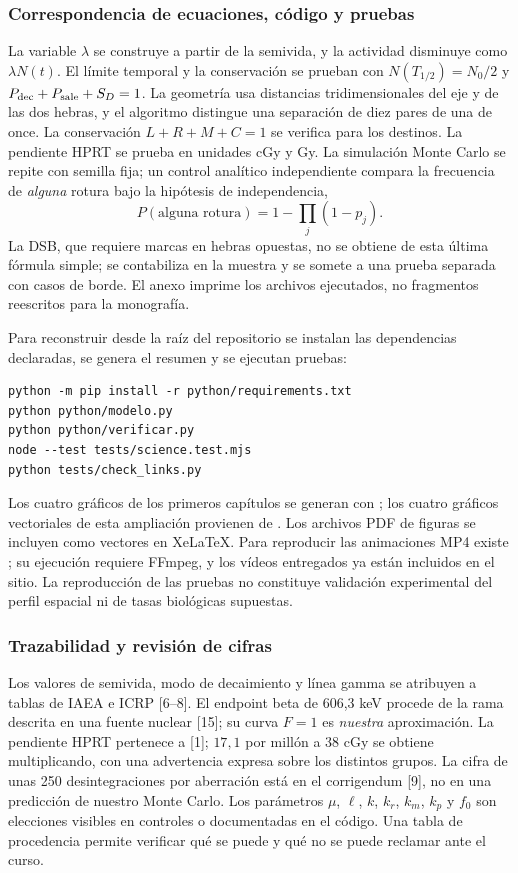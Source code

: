 \documentclass[11pt,a4paper,oneside]{article}
\begin{document}
\subsubsection{Correspondencia de ecuaciones, código y pruebas}
La variable $\lambda$ se construye a partir de la semivida, y la actividad
disminuye como $\lambda N(t)$. El límite temporal y la conservación se
prueban con $N(T_{1/2})=N_0/2$ y
$P_{\rm dec}+P_{\rm sale}+S_D=1$. La geometría usa distancias
tridimensionales del eje y de las dos hebras, y el algoritmo distingue
una separación de diez pares de una de once. La conservación
$L+R+M+C=1$ se verifica para los destinos. La pendiente HPRT se prueba
en unidades cGy y Gy. La simulación Monte Carlo se repite con semilla
fija; un control analítico independiente compara la frecuencia de
\emph{alguna} rotura bajo la hipótesis de independencia,
\[
P(\text{alguna rotura})=1-\prod_{j}(1-p_j).
\]
La DSB, que requiere marcas en hebras opuestas, no se obtiene de esta
última fórmula simple; se contabiliza en la muestra y se somete a una
prueba separada con casos de borde. El anexo imprime los archivos
ejecutados, no fragmentos reescritos para la monografía.

Para reconstruir desde la raíz del repositorio se instalan las
dependencias declaradas, se genera el resumen y se ejecutan pruebas:
\begin{verbatim}
python -m pip install -r python/requirements.txt
python python/modelo.py
python python/verificar.py
node --test tests/science.test.mjs
python tests/check_links.py
\end{verbatim}
Los cuatro gráficos de los primeros capítulos se generan con
; los cuatro gráficos vectoriales
de esta ampliación provienen de .
Los archivos PDF de figuras se incluyen como vectores en XeLaTeX.
Para reproducir las animaciones MP4 existe ; su
ejecución requiere FFmpeg, y los vídeos entregados ya están incluidos
en el sitio. La reproducción de las pruebas no constituye validación
experimental del perfil espacial ni de tasas biológicas supuestas.

\subsubsection{Trazabilidad y revisión de cifras}
Los valores de semivida, modo de decaimiento y línea gamma se atribuyen
a tablas de IAEA e ICRP [6--8]. El endpoint beta de 606,3 keV procede
de la rama descrita en una fuente nuclear [15]; su curva $F=1$ es
\emph{nuestra} aproximación. La pendiente HPRT pertenece a [1]; $17,1$
por millón a 38 cGy se obtiene multiplicando, con una advertencia
expresa sobre los distintos grupos. La cifra de unas 250
desintegraciones por aberración está en el corrigendum [9], no en una
predicción de nuestro Monte Carlo. Los parámetros $\mu$, $\ell$, $k$,
$k_r$, $k_m$, $k_p$ y $f_0$ son elecciones visibles en controles o
documentadas en el código. Una tabla de procedencia permite verificar
qué se puede y qué no se puede reclamar ante el curso.
\end{document}
